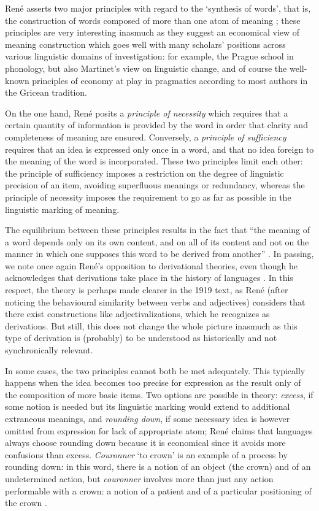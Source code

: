 \documentclass[output=paper]{langsci/langscibook}
\begin{document}
René asserts two major principles with regard to the ‘synthesis of
words’, that is, the construction of words composed of more than one
atom of meaning \citep[99]{r.desaussure11:formation}; these
principles are very interesting inasmuch as they suggest an economical
view of meaning construction which goes well with many scholars’
positions across various linguistic domains of investigation: for
example, the Prague school in phonology, but also Martinet’s view on
linguistic change, and of course the well-known principles of economy
at play in pragmatics according to most authors in the Gricean
tradition.

On the one hand, René posits a \emph{principle of necessity} which
requires that a certain quantity of information is provided by the
word in order that clarity and completeness of meaning are
ensured. Conversely, a \emph{principle of sufficiency} requires that
an idea is expressed only once in a word, and that no idea foreign to
the meaning of the word is incorporated. These two principles limit
each other: the principle of sufficiency imposes a restriction on the
degree of linguistic precision of an item, avoiding superfluous
meanings or redundancy, whereas the principle of necessity imposes the
requirement to go as far as possible in the linguistic marking of
meaning.

The equilibrium between these principles results in the fact that “the
meaning of a word depends only on its own content, and on all of its
content and not on the manner in which one supposes this word to be
derived from another” \citep[99]{r.desaussure11:formation}. In
passing, we note once again René’s opposition to derivational theories,
even though he acknowledges that derivations take place in the history
of languages \citep[120]{r.desaussure11:formation}. In this respect,
the theory is perhaps made clearer in the 1919 text, as René (after
noticing the behavioural similarity between verbs and adjectives)
considers that there exist constructions like adjectivalizations,
which he recognizes as derivations. But still, this does not change
the whole picture inasmuch as this type of derivation is (probably) to
be understood as historically and not synchronically relevant.

In some cases, the two principles cannot both be met adequately. This
typically happens when the idea becomes too precise for expression as
the result only of the composition of more basic items. Two options
are possible in theory: \emph{excess}, if some notion is needed but
its linguistic marking would extend to additional extraneous meanings,
and \emph{rounding down}, if some necessary idea is however omitted
from expression for lack of appropriate atom; René claims that
languages always choose rounding down because it is economical since
it avoids more confusions than excess. \emph{Couronner} ‘to crown’ is
an example of a process by rounding down: in this word, there is a
notion of an object (the crown) and of an undetermined action, but
\emph{couronner} involves more than just any action performable with a
crown: a notion of a patient and of a particular positioning of the
crown \citep[109]{r.desaussure11:formation}.\largerpage[-2]
\end{document}
